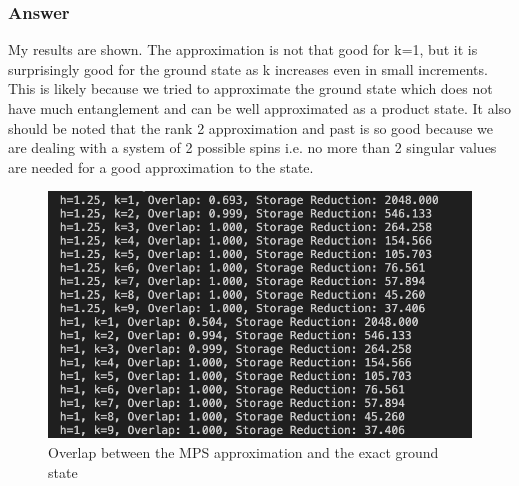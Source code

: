 \documentclass[12pt]{article}
\begin{document}
\subsubsection{Answer}
My results are shown. The approximation is not that good for k=1, but it is surprisingly good for the ground state as k increases even in small increments. This is likely because we tried to approximate the ground state which does not have much entanglement and can be well approximated  as a product state. It also should be noted that the rank 2 approximation and past is so good because we are dealing with a system of 2 possible spins i.e. no more than 2 singular values are needed for a good approximation to the state.
\begin{figure}[h]
\centering
\includegraphics[width=\textwidth]{overlap.png}
\caption{Overlap between the MPS approximation and the exact ground state}
\end{figure}
\end{document}

